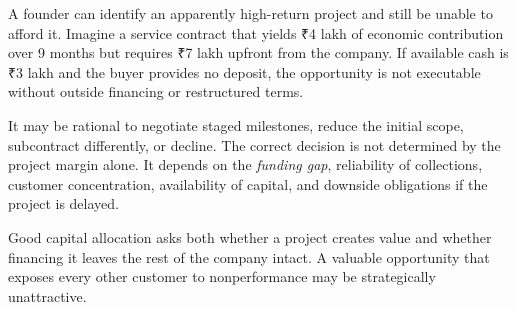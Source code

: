 A founder can identify an apparently high-return project and still be unable to afford it. Imagine a service contract that yields ₹4 lakh of economic contribution over 9 months but requires ₹7 lakh upfront from the company. If available cash is ₹3 lakh and the buyer provides no deposit, the opportunity is not executable without outside financing or restructured terms.

It may be rational to negotiate staged milestones, reduce the initial scope, subcontract differently, or decline. The correct decision is not determined by the project margin alone. It depends on the \emph{funding gap}, reliability of collections, customer concentration, availability of capital, and downside obligations if the project is delayed.

Good capital allocation asks both whether a project creates value and whether financing it leaves the rest of the company intact. A valuable opportunity that exposes every other customer to nonperformance may be strategically unattractive.
